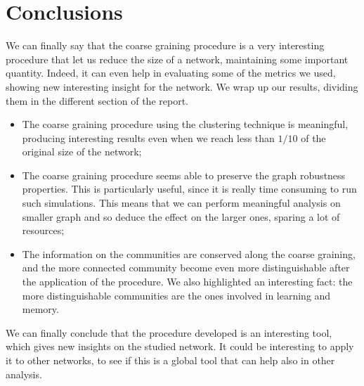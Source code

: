\section{Conclusions}
We can finally say that the coarse graining procedure is a very
interesting procedure that let us reduce the size of a network, 
maintaining some important quantity. Indeed, it can even help in 
evaluating some of the metrics we used, showing new interesting
insight for the network. We wrap up our results, dividing them 
in the different section of the report.
\begin{itemize}
    \item The coarse graining procedure using the clustering technique
        is meaningful, producing interesting results even when we reach
        less than $1/10$ of the original size of the network;
    \item The coarse graining procedure seems able to preserve the 
        graph robustness properties. This is particularly useful, since
        it is really time consuming to run such simulations. This means
        that we can perform meaningful analysis on smaller graph and so
        deduce the effect on the larger ones, sparing a lot of resources;
    \item The information on the communities are conserved along the coarse
        graining, and the more connected community become even more distinguishable
        after the application of the procedure. We also highlighted an interesting
        fact: the more distinguishable communities are the ones involved in 
        learning and memory.
\end{itemize} 
We can finally conclude that the procedure developed is an interesting
tool, which gives new insights on the studied network.
It could be interesting to apply it to other networks, to see if this 
is a global tool that can help also in other analysis.
